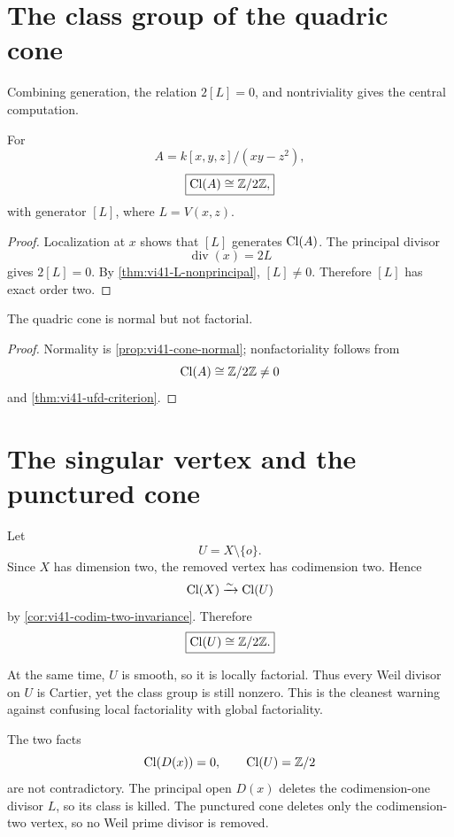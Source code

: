 \section{The class group of the quadric cone}

Combining generation, the relation \(2[L]=0\), and nontriviality gives the central computation.

\begin{theorem}\label{thm:vi41-cone-class-group}
For
\[
 A=k[x,y,z]/(xy-z^2),
\]
\[
 \boxed{
 \operatorname{Cl}(A)\cong\mathbb Z/2\mathbb Z,
 }
\]
with generator \([L]\), where \(L=V(x,z)\).
\end{theorem}

\begin{proof}
Localization at \(x\) shows that \([L]\) generates \(\operatorname{Cl}(A)\). The principal divisor
\[
  \operatorname{div}(x)=2L
\]
gives \(2[L]=0\). By \cref{thm:vi41-L-nonprincipal}, \([L]\neq0\). Therefore \([L]\) has exact order two.
\end{proof}

\begin{corollary}\label{cor:vi41-cone-not-factorial}
The quadric cone is normal but not factorial.
\end{corollary}

\begin{proof}
Normality is \cref{prop:vi41-cone-normal}; nonfactoriality follows from
\[
  \operatorname{Cl}(A)\cong\mathbb Z/2\mathbb Z\neq0
\]
and \cref{thm:vi41-ufd-criterion}.
\end{proof}



\section{The singular vertex and the punctured cone}

Let
\[
 U=X\setminus\{o\}.
\]
Since \(X\) has dimension two, the removed vertex has codimension two. Hence
\[
  \operatorname{Cl}(X)\xrightarrow{\sim}\operatorname{Cl}(U)
\]
by \cref{cor:vi41-codim-two-invariance}. Therefore
\[
  \boxed{\operatorname{Cl}(U)\cong\mathbb Z/2\mathbb Z.}
\]

At the same time, \(U\) is smooth, so it is locally factorial. Thus every Weil divisor on \(U\) is Cartier, yet the class group is still nonzero. This is the cleanest warning against confusing local factoriality with global factoriality.

The two facts
\[
 \operatorname{Cl}(D(x))=0,
 \qquad
 \operatorname{Cl}(U)=\mathbb Z/2
\]
are not contradictory. The principal open \(D(x)\) deletes the codimension-one divisor \(L\), so its class is killed. The punctured cone deletes only the codimension-two vertex, so no Weil prime divisor is removed.

